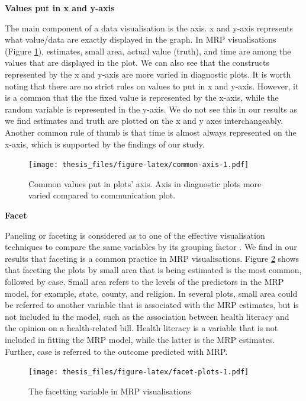 \documentclass{monashthesis}
\begin{document}
\textbf{Values put in x and y-axis}

The main component of a data visualisation is the axis. x and y-axis represents what value/data are exactly displayed in the graph. In MRP visualisations (Figure \ref{fig:common-axis}), estimates, small area, actual value (truth), and time are among the values that are displayed in the plot. We can also see that the constructs represented by the x and y-axis are more varied in diagnostic plots. It is worth noting that there are no strict rules on values to put in x and y-axis. However, it is a common that the the fixed value is represented by the x-axis, while the random variable is represented in the y-axis. We do not see this in our results as we find estimates and truth are plotted on the x and y axes interchangeably. Another common rule of thumb is that time is almost always represented on the x-axis, which is supported by the findings of our study.

\begin{figure}
\centering
\texttt{[image: thesis\_files/figure-latex/common-axis-1.pdf]}
\caption{\label{fig:common-axis}Common values put in plots' axis. Axis in diagnostic plots more varied compared to communication plot.}
\end{figure}

\textbf{Facet}

Paneling or faceting is considered as to one of the effective visualisation techniques to compare the same variables by its grouping factor \autocite{MIDWAY2020100141}. We find in our results that faceting is a common practice in MRP visualisations. Figure \ref{fig:facet-plots} shows that faceting the plots by small area that is being estimated is the most common, followed by case. Small area refers to the levels of the predictors in the MRP model, for example, state, county, and religion. In several plots, small area could be referred to another variable that is associated with the MRP estimates, but is not included in the model, such as the association between health literacy and the opinion on a health-related bill. Health literacy is a variable that is not included in fitting the MRP model, while the latter is the MRP estimates. Further, case is referred to the outcome predicted with MRP.

\begin{figure}
\centering
\texttt{[image: thesis\_files/figure-latex/facet-plots-1.pdf]}
\caption{\label{fig:facet-plots}The facetting variable in MRP visualisations}
\end{figure}
\end{document}
